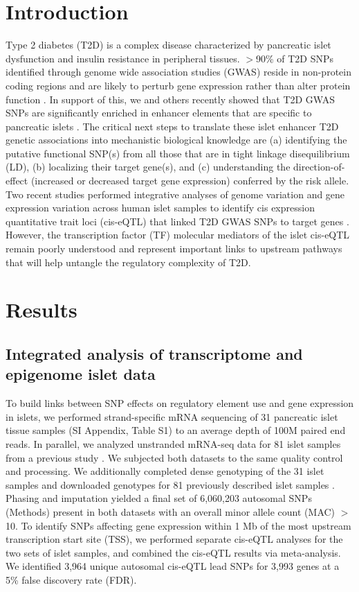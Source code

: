 \section{Introduction}
Type 2 diabetes (T2D) is a complex disease characterized by pancreatic islet dysfunction and insulin resistance in peripheral tissues. $>$90\% of T2D SNPs identified through genome wide association studies (GWAS) reside in non-protein coding regions and are likely to perturb gene expression rather than alter protein function \cite{mohlkeRecentAdvancesUnderstanding2015}. In support of this, we and others recently showed that T2D GWAS SNPs are significantly enriched in enhancer elements that are specific to pancreatic islets \cite{parkerChromatinStretchEnhancer2013, pasqualiPancreaticIsletEnhancer2014, trynkaChromatinMarksIdentify2013}. The critical next steps to translate these islet enhancer T2D genetic associations into mechanistic biological knowledge are (a) identifying the putative functional SNP(s) from all those that are in tight linkage disequilibrium (LD), (b) localizing their target gene(s), and (c) understanding the direction-of-effect (increased or decreased target gene expression) conferred by the risk allele. Two recent studies performed integrative analyses of genome variation and gene expression variation across human islet samples to identify cis expression quantitative trait loci (cis-eQTL) that linked T2D GWAS SNPs to target genes \cite{fadistaGlobalGenomicTranscriptomic2014, vandebuntTranscriptExpressionData2015}. However, the transcription factor (TF) molecular mediators of the islet cis-eQTL remain poorly understood and represent important links to upstream pathways that will help untangle the regulatory complexity of T2D. 

\section{Results}
\subsection{Integrated analysis of transcriptome and epigenome islet data}
To build links between SNP effects on regulatory element use and gene expression in islets, we performed strand-specific mRNA sequencing of 31 pancreatic islet tissue samples (SI Appendix, Table S1) to an average depth of 100M paired end reads. In parallel, we analyzed unstranded mRNA-seq data for 81 islet samples from a previous study \cite{fadistaGlobalGenomicTranscriptomic2014}. We subjected both datasets to the same quality control and processing. We additionally completed dense genotyping of the 31 islet samples and downloaded genotypes for 81 previously described islet samples \cite{fadistaGlobalGenomicTranscriptomic2014}. Phasing and imputation yielded a final set of 6,060,203 autosomal SNPs (Methods) present in both datasets with an overall minor allele count (MAC) $>$10. To identify SNPs affecting gene expression within 1 Mb of the most upstream transcription start site (TSS), we performed separate cis-eQTL analyses for the two sets of islet samples, and combined the cis-eQTL results via meta-analysis. We identified 3,964 unique autosomal cis-eQTL lead SNPs for 3,993 genes at a 5\% false discovery rate (FDR). 

